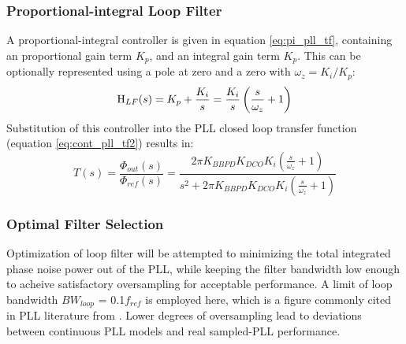 \subsubsection{Proportional-integral Loop Filter}
 A proportional-integral controller \cite{ogata_2010_pid} is given in equation \ref{eq:pi_pll_tf}, containing an proportional gain term $K_p$, and an integral gain term $K_p$. This can be optionally represented using a pole at zero and a zero with $\omega_z = K_i/K_p$:
			\begin{equation} \label{eq:pi_pll_tf}
				\textnormal{H}_{LF}(s) = K_p + \frac{K_i}{s}  = \frac{K_i}{s}\left(\frac{s}{\omega_z} + 1\right) 
			\end{equation}
			Substitution of this controller into the PLL closed loop transfer function (equation \ref{eq:cont_pll_tf2}) results in:
			\begin{equation}\label{eq:pi_bbpdpll_tf}
				T(s) = \frac{\Phi_{out}(s)}{\Phi_{ref}(s)} =  \frac{ 2\pi K_{BBPD}K_{DCO}K_{i} \left(\frac{s}{\omega_z} + 1\right) }{s^2 + 2\pi K_{BBPD}K_{DCO}K_{i}\left(\frac{s}{\omega_z} + 1\right) }
			\end{equation}
\subsubsection{Optimal Filter Selection}
			Optimization of loop filter will be attempted to minimizing the total integrated phase noise power out of the PLL, while keeping the filter bandwidth low enough to acheive satisfactory oversampling for acceptable performance. A limit of loop bandwidth $BW_{loop}$ = 0.1$f_{ref}$ is employed here, which is a figure commonly cited in PLL literature from \cite{gardner_1980}. Lower degrees of oversampling lead to deviations between continuous PLL models and real sampled-PLL performance. 

